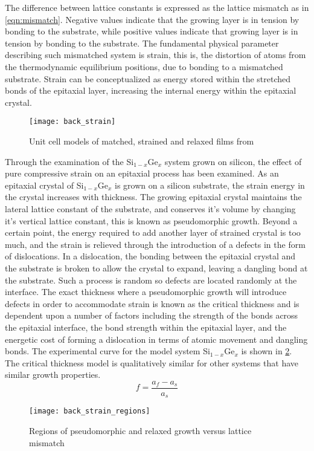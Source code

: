 The difference between lattice constants is expressed as the lattice mismatch as in \cref{eqn:mismatch}. Negative values indicate that the growing layer is in tension by bonding to the substrate, while positive values indicate that growing layer is in tension by bonding to the substrate. The fundamental physical parameter describing such mismatched system is strain, this is, the distortion of atoms from the thermodynamic equilibrium positions, due to bonding to a mismatched substrate. Strain can be conceptualized as energy stored within the stretched bonds of the epitaxial layer, increasing the internal energy within the epitaxial crystal.
\begin{figure}
    \centering
    \texttt{[image: back\_strain]}
    \caption{\label{fig:back_strain}Unit cell models of matched, strained and relaxed films from \cite{ohring2001materials}}
\end{figure}

Through the examination of the Si$_{1-x}$Ge$_x$ system grown on silicon, the effect of pure compressive strain on an epitaxial process has been examined. As an epitaxial crystal of Si$_{1-x}$Ge$_x$ is grown on a silicon substrate, the strain energy in the crystal increases with thickness. The growing epitaxial crystal maintains the lateral lattice constant of the substrate, and conserves it's volume by changing it's vertical lattice constant, this is known as pseudomorphic growth. Beyond a certain point, the energy required to add another layer of strained crystal is too much, and the strain is relieved through the introduction of a defects in the form of dislocations. In a dislocation, the bonding between the epitaxial crystal and the substrate is broken to allow the crystal to expand, leaving a dangling bond at the substrate. Such a process is random so defects are located randomly at the interface. The exact thickness where a pseudomorphic growth will introduce defects in order to accommodate strain is known as the critical thickness and is dependent upon a number of factors including the strength of the bonds across the epitaxial interface, the bond strength within the epitaxial layer, and the energetic cost of forming a dislocation in terms of atomic movement and dangling bonds. The experimental curve for the model system Si$_{1-x}$Ge$_x$  is shown in \cref{fig:back_strain_regions}. The critical thickness model is qualitatively similar for other systems that have similar growth properties.
\begin{equation}
f = \frac{a_f - a_s}{a_s} \label{eqn:mismatch}
\end{equation}
\begin{figure}
    \centering
    \texttt{[image: back\_strain\_regions]}
    \caption{\label{fig:back_strain_regions}Regions of pseudomorphic and relaxed growth versus lattice mismatch\cite{Bean1986}}
\end{figure}
